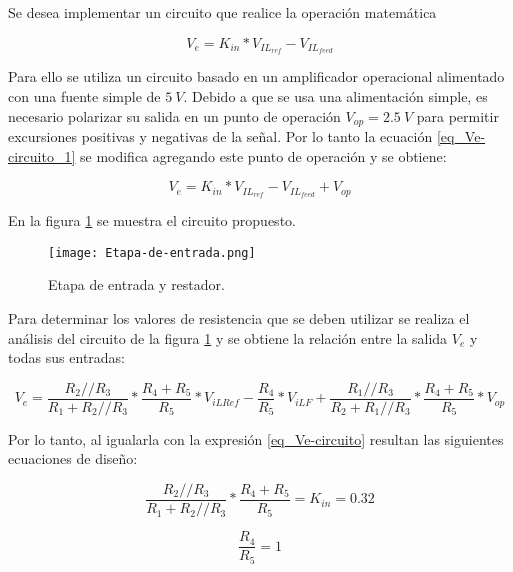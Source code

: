 Se desea implementar un circuito que realice la operación matemática 

\begin{equation}\label{eq_Ve-circuito_1}
	V_e=K_{in}*V_{IL_{ref}} - V_{IL_{feed}}
\end{equation}

Para ello se utiliza un circuito basado en un amplificador operacional alimentado con una fuente simple de $5\:V$. Debido a que se usa una alimentación simple, es necesario polarizar su salida en un punto de operación $V_{op}=2.5\:V$ para permitir excursiones positivas y negativas de la señal. Por lo tanto la ecuación \ref{eq_Ve-circuito_1} se modifica agregando este punto de operación y se obtiene:

\begin{equation}\label{eq_Ve-circuito}
V_e=K_{in}*V_{IL_{ref}} - V_{IL_{feed}} + V_{op}
\end{equation}

En la figura \ref{fig:img_etapa-de-entrada} se muestra el circuito propuesto. 


\begin{figure}[H]
	\centering
	\texttt{[image: Etapa-de-entrada.png]}
	\caption{Etapa de entrada y restador.}
	\label{fig:img_etapa-de-entrada}
\end{figure}

Para determinar los valores de resistencia que se deben utilizar se realiza el análisis del circuito de la figura \ref{fig:img_etapa-de-entrada} y se obtiene la relación entre la salida $V_e$ y todas sus entradas:

\begin{equation*}
	V_e = \frac{R_{2}//R_{3}}{R_{1}+R_{2}//R_{3}}*\frac{R_{4}+R_{5}}{R_{5}}*V_{iLRef}-\frac{R_{4}}{R_{5}}*V_{iLF}+\frac{R_{1}//R_{3}}{R_{2}+R_{1}//R_{3}}*\frac{R_{4}+R_{5}}{R_{5}}* V_{op}
\end{equation*}

Por lo tanto, al igualarla con la expresión \ref{eq_Ve-circuito} resultan las siguientes ecuaciones de diseño:

\begin{equation} \label{eq_ve_operacional-1}
	\frac{R_{2}//R_{3}}{R_{1}+R_{2}//R_{3}}*\frac{R_{4}+R_{5}}{R_{5}} = K_{in} = 0.32
\end{equation}

\begin{equation} \label{eq_ve_operacional-2}
	\frac{R_{4}}{R_{5}} = 1
\end{equation}

